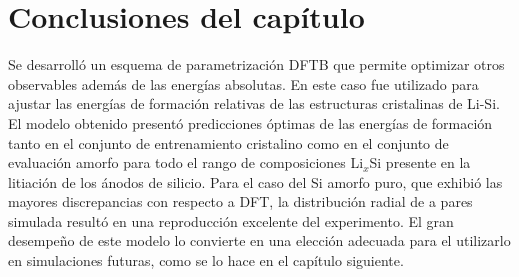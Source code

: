 \section{Conclusiones del capítulo}

Se desarrolló un esquema de parametrización DFTB que permite optimizar otros 
observables además de las energías absolutas. En este caso fue utilizado para 
ajustar las energías de formación relativas de las estructuras cristalinas de 
Li-Si. El modelo obtenido presentó predicciones óptimas de las energías de 
formación tanto en el conjunto de entrenamiento cristalino como en el conjunto 
de evaluación amorfo para todo el rango de composiciones Li$_x$Si presente en 
la litiación de los ánodos de silicio. Para el caso del Si amorfo puro, que 
exhibió las mayores discrepancias con respecto a DFT, la distribución radial de 
a pares simulada resultó en una reproducción excelente del experimento. El gran
desempeño de este modelo lo convierte en una elección adecuada para el utilizarlo
en simulaciones futuras, como se lo hace en el capítulo siguiente.
